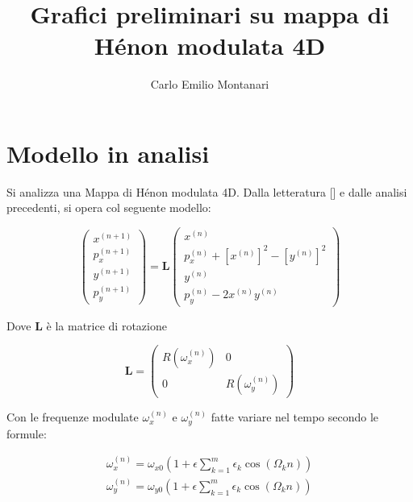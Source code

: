 \documentclass[10pt,a4paper]{article}
\title{Grafici preliminari su mappa di Hénon modulata 4D}
\author{Carlo Emilio Montanari}
\begin{document}
\maketitle

\section{Modello in analisi}

Si analizza una Mappa di Hénon modulata 4D. Dalla letteratura [] e dalle analisi precedenti, si opera col seguente modello:

\begin{equation}
    \left(\begin{array}{c}
    x^{(n+1)} \\
    p_{x}^{(n+1)} \\
    y^{(n+1)} \\
    p_{y}^{(n+1)}
    \end{array}\right)=\mathbf{L}\left(\begin{array}{c}
    x^{(n)} \\
    p_{x}^{(n)}+\left[x^{(n)}\right]^{2}-\left[y^{(n)}\right]^{2} \\
    y^{(n)} \\
    p_{y}^{(n)}-2 x^{(n)} y^{(n)}
    \end{array}\right)
\end{equation}

Dove $\mathbf{L}$ è la matrice di rotazione

\begin{equation}
    \mathbf{L}=\left(\begin{array}{cc}
    R\left(\omega_{x}^{(n)}\right) & 0 \\
    0 & R\left(\omega_{y}^{(n)}\right)
    \end{array}\right)
\end{equation}

Con le frequenze modulate $\omega_{x}^{(n)}$ e $\omega_{y}^{(n)}$ fatte variare nel tempo secondo le formule:

\begin{equation}
    \begin{array}{l}
    \omega_{x}^{(n)}=\omega_{x 0}\left(1+\epsilon \sum_{k=1}^{m} \epsilon_{k} \cos \left(\Omega_{k} n\right)\right) \\
    \omega_{y}^{(n)}=\omega_{y 0}\left(1+\epsilon \sum_{k=1}^{m} \epsilon_{k} \cos \left(\Omega_{k} n\right)\right)
    \end{array}
\end{equation}
\end{document}
